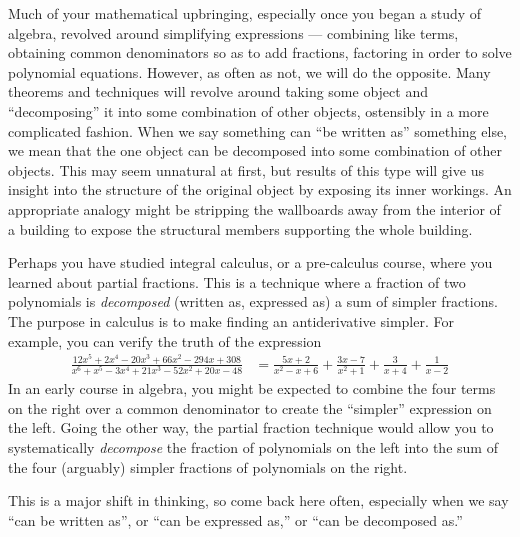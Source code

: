 Much of your mathematical upbringing, especially once you began a study of algebra, revolved around simplifying expressions --- combining like terms, obtaining common denominators so as to add fractions, factoring in order to solve polynomial equations.  However, as often as not, we will do the opposite.  Many theorems and techniques will revolve around taking some object and ``decomposing'' it into some combination of other objects, ostensibly in a more complicated fashion.  When we say something can ``be written as'' something else, we mean that the one object can be decomposed into some combination of other objects.  This may seem unnatural at first, but results of this type will give us insight into the structure of the original object by exposing its inner workings.  An appropriate analogy might be stripping the wallboards away from the interior of a building to expose the structural members supporting the whole building.\par
%
Perhaps you have studied integral calculus, or a pre-calculus course, where you learned about partial fractions.  This is a technique where a fraction of two polynomials is {\em decomposed} (written as, expressed as) a sum of simpler fractions.  The purpose in calculus is to make finding an antiderivative simpler.  For example, you can verify the truth of the expression
%
\begin{align*}
\frac{{12 {x}^{5} } + {2 {x}^{4} } - {20 {x}^{3} } + {66 {x}^{2} } -{294 x} + 308}
{{x}^{6}  + {x}^{5}  - {3 {x}^{4} } + {21 {x}^{3} } - {52{x}^{2} } + {20 x} - 48}
&=
\frac{{5 x} + 2}{{x}^{2} - x + 6} +
\frac{{3 x} - 7}{{x}^{2}  + 1} +
\frac{3}{x + 4} +
\frac{1}{x - 2}
\end{align*}
%
In an early course in algebra, you might be expected to combine the four terms on the right over a common denominator to create the ``simpler'' expression on the left.  Going the other way, the partial fraction technique would allow you to systematically {\em decompose} the fraction of polynomials on the left into the sum of the four (arguably) simpler fractions of polynomials on the right.\par
%
This is a major shift in thinking, so come back here often, especially when we say ``can be written as'', or ``can be expressed as,'' or ``can be decomposed as.''
